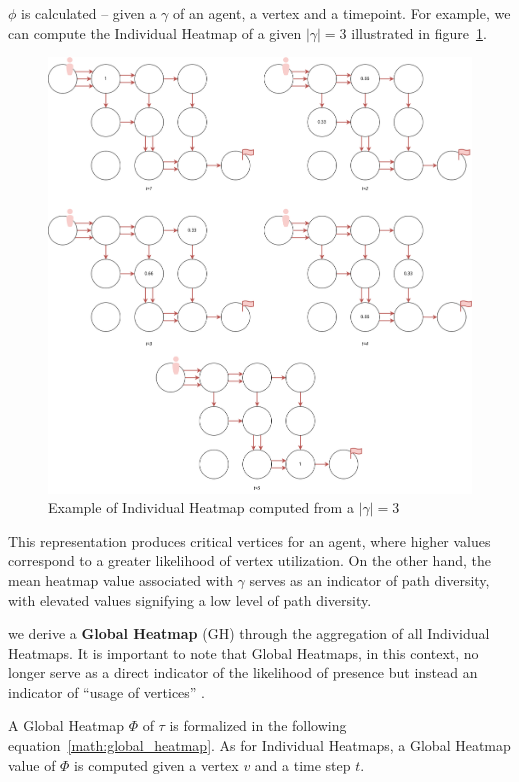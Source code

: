 \(\phi\) is calculated --  given a \(\gamma\) of an agent, a vertex and a timepoint. For example, we can compute the Individual Heatmap of a given \(|\gamma|=3\) illustrated in figure~\ref{fig:individual_heatmap}.

\begin{figure}[H]
    \centering
    \caption{Example of Individual Heatmap computed from a \(|\gamma|=3\)}\label{fig:individual_heatmap}
    \includegraphics[width=\widthimg]{img/individual_heatmap.drawio.png}
\end{figure}

This representation produces critical vertices for an agent, where higher values correspond to a greater likelihood of vertex utilization. On the other hand, the mean heatmap value associated with \(\gamma\) serves as an indicator of path diversity, with elevated values signifying a low level of path diversity.

we derive a \textbf{Global Heatmap} (GH) through the aggregation of all Individual Heatmaps. It is important to note that Global Heatmaps, in this context, no longer serve as a direct indicator of the likelihood of presence but instead an indicator of ``usage of vertices'' .

A Global Heatmap \(\Phi\) of \(\tau\) is formalized in the following equation~\ref{math:global_heatmap}. As for Individual Heatmaps, a Global Heatmap value of \(\Phi\) is computed given a vertex \(v\) and a time step \(t\).  

